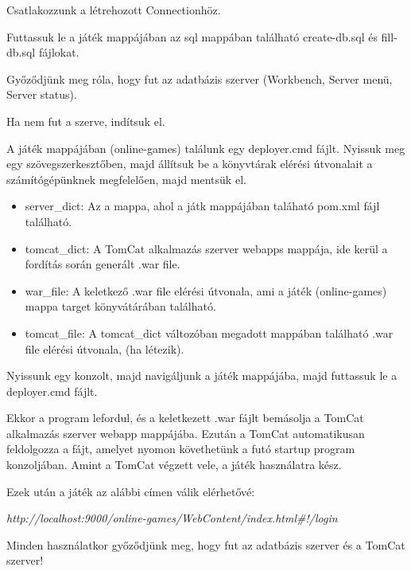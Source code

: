 Csatlakozzunk a létrehozott Connectionhöz.

Futtassuk le a játék mappájában az sql mappában található create-db.sql és fill-db.sql fájlokat.

Győződjünk meg róla, hogy fut az adatbázis szerver (Workbench, Server menü, Server status).

Ha nem fut a szerve, indítsuk el. \newline

A játék mappájában (online-games) találunk egy deployer.cmd fájlt. Nyissuk meg egy szövegszerkesztőben, majd állítsuk be a könyvtárak elérési útvonalait a számítógépünknek megfelelően, majd mentsük el.

\begin{itemize}
	\item server\_dict: Az a mappa, ahol a játk mappájában taláható pom.xml fájl található.
	\item tomcat\_dict: A TomCat alkalmazás szerver webapps mappája, ide kerül a fordítás során generált .war file.
	\item war\_file: A keletkező .war file elérési útvonala, ami a játék (online-games) mappa target könyvátárában található.
	\item tomcat\_file: A tomcat\_dict változóban megadott mappában található .war file elérési útvonala, (ha létezik).
\end{itemize}

Nyissunk egy konzolt, majd navigáljunk a játék mappájába, majd futtassuk le a deployer.cmd fájlt. \newline

Ekkor a program lefordul, és a keletkezett .war fájlt bemásolja a TomCat alkalmazás szerver webapp mappájába. Ezután a TomCat automatikusan feldolgozza a fájt, amelyet nyomon követhetünk a futó startup program konzoljában. Amint a TomCat végzett vele, a játék használatra kész. \newline

Ezek után a játék az alábbi címen válik elérhetővé:

\textit{http://localhost:9000/online-games/WebContent/index.html\#!/login}  \newline

Minden használatkor győződjünk meg, hogy fut az adatbázis szerver és a TomCat szerver!